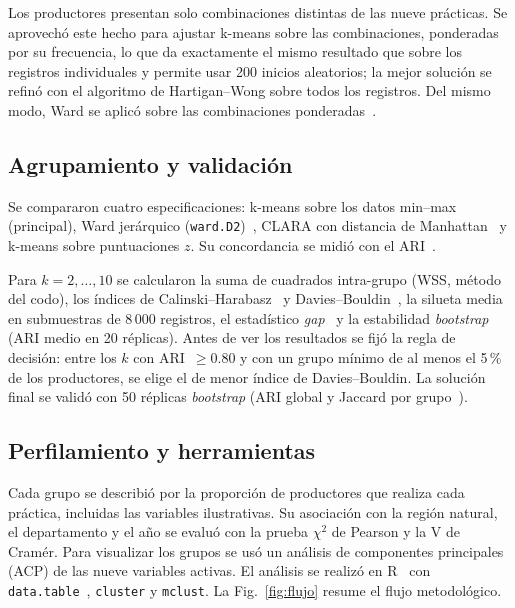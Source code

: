\documentclass[10pt,twocolumn,a4paper]{article}
\begin{document}
Los \nValid{} productores presentan solo \nPatterns{} combinaciones distintas de las nueve prácticas. Se aprovechó este hecho para ajustar k-means sobre las combinaciones, ponderadas por su frecuencia, lo que da exactamente el mismo resultado que sobre los registros individuales y permite usar 200 inicios aleatorios; la mejor solución se refinó con el algoritmo de Hartigan--Wong sobre todos los registros. Del mismo modo, Ward se aplicó sobre las combinaciones ponderadas~\cite{murtagh2014}.

\subsection{Agrupamiento y validación}
Se compararon cuatro especificaciones: k-means sobre los datos min--max (principal), Ward jerárquico (\texttt{ward.D2})~\cite{ward1963}, CLARA con distancia de Manhattan~\cite{kaufman1990} y k-means sobre puntuaciones $z$. Su concordancia se midió con el ARI~\cite{hubert1985}.

Para $k=2,\dots,10$ se calcularon la suma de cuadrados intra-grupo (WSS, método del codo), los índices de Calinski--Harabasz~\cite{calinski1974} y Davies--Bouldin~\cite{davies1979}, la silueta media~\cite{rousseeuw1987} en submuestras de 8\,000 registros, el estadístico \textit{gap}~\cite{tibshirani2001} y la estabilidad \textit{bootstrap} (ARI medio en 20 réplicas). Antes de ver los resultados se fijó la regla de decisión: entre los $k$ con ARI~$\geq 0.80$ y con un grupo mínimo de al menos el 5\,\% de los productores, se elige el de menor índice de Davies--Bouldin. La solución final se validó con 50 réplicas \textit{bootstrap} (ARI global y Jaccard por grupo~\cite{hennig2007}).

\subsection{Perfilamiento y herramientas}
Cada grupo se describió por la proporción de productores que realiza cada práctica, incluidas las variables ilustrativas. Su asociación con la región natural, el departamento y el año se evaluó con la prueba $\chi^2$ de Pearson y la V de Cramér. Para visualizar los grupos se usó un análisis de componentes principales (ACP) de las nueve variables activas. El análisis se realizó en R~\cite{rcore} con \texttt{data.table}~\cite{datatable}, \texttt{cluster} y \texttt{mclust}. La Fig.~\ref{fig:flujo} resume el flujo metodológico.
\end{document}
